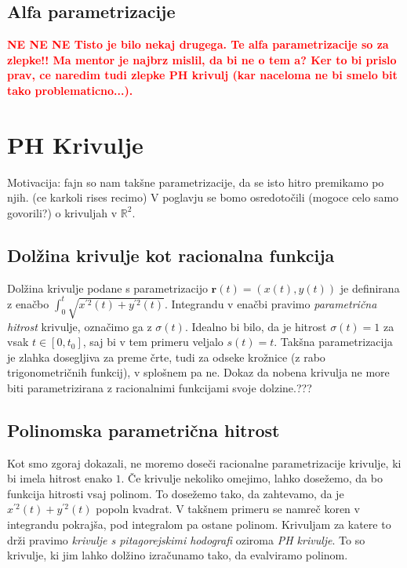 \documentclass[isrm2, tisk]{fmfdelo}
\newcommand{\R}{\mathbb R}
\newcommand{\mycomment}[1]{\textbf{\textcolor{red}{#1}}}
\begin{document}
    \subsection{Alfa parametrizacije}
    \mycomment{NE
    NE
    NE
    Tisto je bilo nekaj drugega. Te alfa parametrizacije so za zlepke!! Ma mentor je najbrz mislil, da bi ne o tem a?
    Ker to bi prislo prav, ce naredim tudi zlepke PH krivulj (kar naceloma ne bi smelo bit tako problematicno...).
    }


    \section{PH Krivulje}
    Motivacija: fajn so nam takšne parametrizacije, da se isto hitro premikamo po njih. (ce karkoli rises recimo)
    V poglavju se bomo osredotočili (mogoce celo samo govorili?) o krivuljah v $\R^2$.

    \subsection{Dolžina krivulje kot racionalna funkcija}
    Dolžina krivulje podane s parametrizacijo  $\mathbf{r}(t) = \left(x(t),y(t)\right)$ je definirana z enačbo $\int_0^t \sqrt {x^{'2}(t)+y^{'2}(t)}$.
    Integrandu v enačbi pravimo \textit{parametrična hitrost} krivulje, označimo ga z $\sigma(t)$.
    Idealno bi bilo, da je hitrost $\sigma(t) = 1$ za vsak $t\in [0,t_0]$, saj bi v tem primeru veljalo $s(t)=t$.
    Takšna parametrizacija je zlahka dosegljiva za preme črte, tudi za odseke krožnice (z rabo trigonometričnih funkcij), v splošnem pa ne.
    Dokaz da nobena krivulja ne more biti parametrizirana z racionalnimi funkcijami svoje dolzine.???

    \subsection{Polinomska parametrična hitrost}
    Kot smo zgoraj dokazali, ne moremo doseči racionalne parametrizacije krivulje, ki bi imela hitrost enako $1$.
    Če krivulje nekoliko omejimo, lahko dosežemo, da bo funkcija hitrosti vsaj polinom.
    To dosežemo tako, da zahtevamo, da je $x^{'2}(t)+y^{'2}(t)$ popoln kvadrat.
    V takšnem primeru se namreč koren v integrandu pokrajša, pod integralom pa ostane polinom.
    Krivuljam za katere to drži pravimo \textit{krivulje s pitagorejskimi hodografi} oziroma \textit{PH krivulje}.
    To so krivulje, ki jim lahko dolžino izračunamo tako, da evalviramo polinom.
\end{document}
